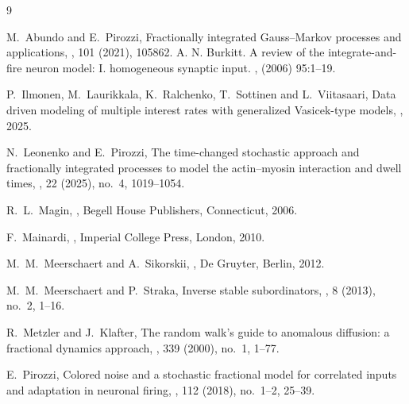 \documentclass[11pt,reqno,oneside, a4paper]{amsart}
\numberwithin{equation}{section}
\theoremstyle{remark}
\begin{document}
\begin{thebibliography}{9}

	M.~Abundo and E.~Pirozzi,
	\newblock Fractionally integrated Gauss--Markov processes and applications,
	,
	101 (2021), 105862.
A. N. Burkitt. 
\newblock A review of the integrate-and-fire neuron model: I. homogeneous synaptic input. , (2006) 95:1--19.

	


	P.~Ilmonen, M.~Laurikkala, K.~Ralchenko, T.~Sottinen and L.~Viitasaari,
	\newblock Data driven modeling of multiple interest rates with generalized
	Vasicek-type models,
	, 2025.

	

	
	N.~Leonenko and E.~Pirozzi,
	\newblock The time-changed stochastic approach and fractionally integrated
	processes to model the actin--myosin interaction and dwell times,
	,
	22 (2025), no.~4, 1019--1054.
	

	
	R.~L.~Magin,
	,
	\newblock Begell House Publishers, Connecticut, 2006.
	
	F.~Mainardi,
	,
	\newblock Imperial College Press, London, 2010.
	
	M.~M.~Meerschaert and A.~Sikorskii,
	,
	\newblock De Gruyter, Berlin, 2012.
	
	M.~M.~Meerschaert and P.~Straka,
	\newblock Inverse stable subordinators,
	,
	8 (2013), no.~2, 1--16.
	
	R.~Metzler and J.~Klafter,
	\newblock The random walk's guide to anomalous diffusion:
	a fractional dynamics approach,
	,
	339 (2000), no.~1, 1--77.
	
	E.~Pirozzi,
	\newblock Colored noise and a stochastic fractional model for correlated inputs
	and adaptation in neuronal firing,
	,
	112 (2018), no.~1--2, 25--39.


\end{thebibliography}
\end{document}
